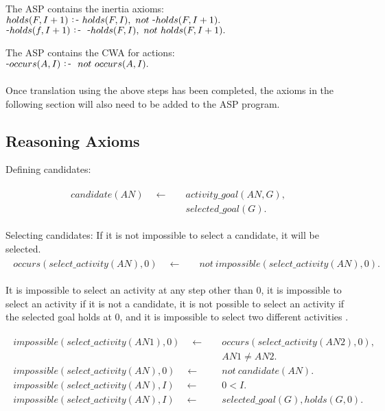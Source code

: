 \documentclass[11pt, oneside]{article}
\def\-{\raisebox{.75pt}{-}}
\def\:-{\raisebox{.75pt}{\ :\,-\ }}
\begin{document}
The ASP contains the inertia axioms:\\
$holds(F, I+1) \:- holds(F, I),\ not\  \-holds(F, I+1).$\\

$\-holds(f, I+1) \:-\ \-holds(F, I),\ not\  holds(F, I+1).$\par

The ASP contains the CWA for actions:\\
$\-occurs(A, I) \:-\ not\  occurs(A, I).$\\
\\
Once translation using the above steps has been completed, the axioms in the following section will also need to be added to the ASP program.


\subsection{Reasoning Axioms}
Defining candidates:

\begin{align}\begin{split}
candidate(AN) \quad \leftarrow \quad 
&activity\_goal(AN,G),\\
&selected\_goal(G).
\end{split}\end{align}

Selecting candidates:
If it is not impossible to select a candidate, it will be selected.
\begin{align}\begin{split}
occurs(select\_activity(AN),0) \quad \leftarrow \quad 
&not\ impossible(select\_activity(AN),0).
\end{split}\end{align}

It is impossible to select an activity at any step other than 0, it is impossible to select an activity if it is not a candidate, it is not possible to select an activity if the selected goal holds at 0, and it is impossible to select two different activities .

\begin{align}\begin{split}
impossible(select\_activity(AN1),0) \quad \leftarrow \quad &occurs(select\_activity(AN2),0),\\ &AN1\neq AN2.\\
impossible(select\_activity(AN),0) \quad \leftarrow \quad &not\ candidate(AN).\\
impossible(select\_activity(AN),I) \quad \leftarrow \quad &0<I.\\
impossible(select\_activity(AN),I) \quad \leftarrow \quad &selected\_goal(G), holds(G,0).
\end{split}\end{align}
\end{document}
